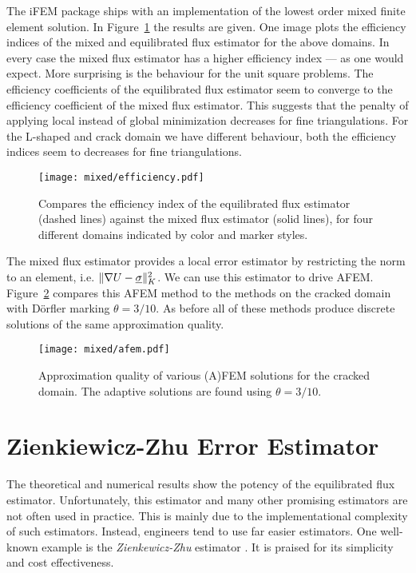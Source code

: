 \documentclass[thesis.tex]{subfiles}
\begin{document}
The iFEM package ships with an implementation of the lowest order mixed finite element solution. In Figure~\ref{fig:effmixed} the results are given.
One image plots the efficiency indices of the mixed and equilibrated flux estimator
for the above domains. In every case the mixed flux estimator has a higher efficiency index  --- as one would expect. 
More surprising is the behaviour for the unit square problems. The efficiency coefficients of the equilibrated flux estimator
seem to  converge to the efficiency coefficient of the mixed flux estimator. This suggests that the penalty of applying
local instead of global minimization decreases for fine triangulations. For the L-shaped and crack domain we have different behaviour,
both the efficiency indices seem to decreases for fine triangulations. 
\begin{figure}
  \centering
  \texttt{[image: mixed/efficiency.pdf]}
  \caption{
    Compares the efficiency index of the equilibrated flux estimator (dashed lines) against the mixed flux estimator (solid lines), for
  four different domains indicated by color and marker styles.}
  \label{fig:effmixed}
\end{figure}

The mixed flux estimator provides a local error estimator by restricting the norm to an element, i.e. $\| \nabla U - \underline{\sigma} \|^2_K$. We
can use this estimator to drive AFEM. Figure~\ref{fig:afemmixed} compares this AFEM method to the methods on the cracked domain with D\"orfler marking $\theta = 3/10$. 
As before all of these methods produce discrete solutions of the same approximation quality. 
\begin{figure}
  \centering
  \texttt{[image: mixed/afem.pdf]}
  \caption{
    Approximation quality of various (A)FEM solutions for the cracked domain. The adaptive solutions are found using $\theta = 3/10$.
  }
  \label{fig:afemmixed}
\end{figure}
\section{Zienkiewicz-Zhu Error Estimator}
The theoretical and numerical results show the potency of the equilibrated flux estimator. Unfortunately, this estimator and many other promising
estimators are not often used in practice. This is mainly due to the implementational complexity of such estimators.
Instead, engineers tend to use far easier estimators. One well-known example is the \emph{Zienkewicz-Zhu} estimator 
\cite{zienkiewicz1987simple, zienkiewicz1992superconvergent}. It is praised for its simplicity and cost effectiveness.
\end{document}
